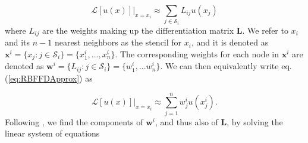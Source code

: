 \documentclass[10pt,a4paper]{article}
\begin{document}
\begin{equation}\label{eq:RBFFDApprox}
\mathcal{L}[u(x)]\big|_{x=x_i} \approx \sum_{j \in \mathcal{S}_i} L_{ij} u(x_j)
\end{equation}
where $L_{ij}$ are the weights making up the differentiation matrix $\mathbf{L}$.  We refer to $x_i$ and its $n-1$ nearest neighbors as the stencil for $x_i$, and it is denoted as $\mathbf{x}^i = \{x_j : j \in \mathcal{S}_i\} = \{x^i_1,..., x^i_n\}$. The corresponding weights for each node in $\mathbf{x}^i$ are denoted as $\mathbf{w}^i = \{L_{ij} : j \in \mathcal{S}_i\} = \{w^i_1,...w^i_n\}$.  We can then equivalently write eq. (\ref{eq:RBFFDApprox}) as 

\begin{equation}\label{eq:RBFFDApproxAlt}
\mathcal{L}[u(x)]\big|_{x=x_i} \approx \sum_{j=1}^n w^i_j u(x^i_j).
\end{equation}
Following \citet{Fornberg2015}, we find the components of $\mathbf{w}^i$, and thus also of $\mathbf{L}$, by solving the linear system of equations
\end{document}
